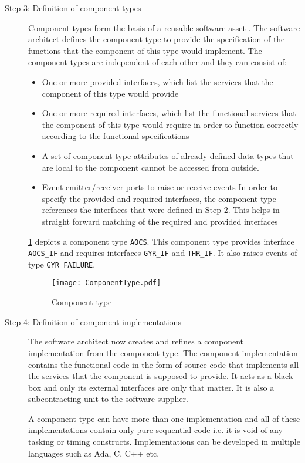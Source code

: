\begin{description}
\item [Step 3: Definition of component types] Component types form the basis of a reusable software asset \cite{CompBasedProcess}. The software architect defines the component type to provide the specification of the functions that the component of this type would implement. The component types are independent of each other and they can consist of:
\begin{itemize}
\item One or more provided interfaces, which list the services that the component of this type would provide
\item One or more required interfaces, which list the functional services that the component of this type would require in order to function correctly according to the functional specifications
\item A set of component type attributes of already defined data types that are local to the component cannot be accessed from outside.
\item Event emitter/receiver ports to raise or receive events
In order to specify the provided and required interfaces, the component type references the interfaces that were defined in Step 2. This helps in straight forward matching of the required and provided interfaces  
\end{itemize}

\cref{fig: Component type} depicts a component type \texttt{AOCS}. This component type provides interface \texttt{AOCS\_IF} and requires interfaces \texttt{GYR\_IF} and \texttt{THR\_IF}. It also raises events of type \texttt{GYR\_FAILURE}. 

\begin{figure}[h]
	\centering
	\texttt{[image: ComponentType.pdf]}
	\caption{Component type}
	\label{fig: Component type}
\end{figure}

\item [Step 4: Definition of component implementations] The software architect now creates and refines a component implementation from the component type. The component implementation contains the functional code in the form of source code that implements all the services that the component is supposed to provide. It acts as a  black box and only its external interfaces are only that matter. It is also a subcontracting unit to the software supplier. 

A component type can have more than one implementation and all of these implementations contain only pure sequential code i.e. it is void of any tasking or timing constructs. Implementations can be developed in multiple languages such as Ada, C, C++ etc.  


\end{description}
